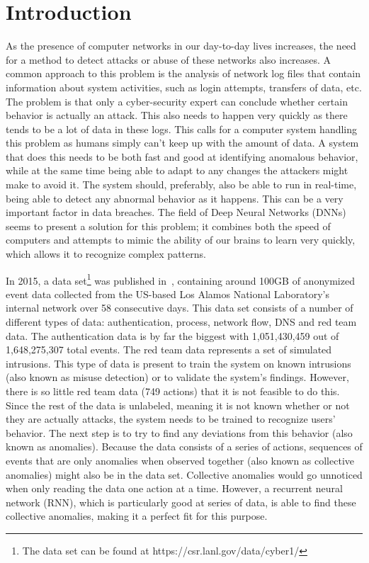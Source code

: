 \chapter{Introduction}\label{ch:introduction}
As the presence of computer networks in our day-to-day lives increases, the need for a method to detect attacks or abuse of these networks also increases. A common approach to this problem is the analysis of network log files that contain information about system activities, such as login attempts, transfers of data, etc. The problem is that only a cyber-security expert can conclude whether certain behavior is actually an attack. This also needs to happen very quickly as there tends to be a lot of data in these logs. This calls for a computer system handling this problem as humans simply can't keep up with the amount of data. A system that does this needs to be both fast and good at identifying anomalous behavior, while at the same time being able to adapt to any changes the attackers might make to avoid it. The system should, preferably, also be able to run in real-time, being able to detect any abnormal behavior as it happens. This can be a very important factor in data breaches. The field of Deep Neural Networks (DNNs) seems to present a solution for this problem; it combines both the speed of computers and attempts to mimic the ability of our brains to learn very quickly, which allows it to recognize complex patterns.

In 2015, a data set\footnote{The data set can be found at https://csr.lanl.gov/data/cyber1/} was published in~\cite{akent-2015-enterprise-data}, containing around 100GB of anonymized event data collected from the US-based Los Alamos National Laboratory's internal network over 58 consecutive days. This data set consists of a number of different types of data: authentication, process, network flow, DNS and red team data. The authentication data is by far the biggest with 1,051,430,459 out of 1,648,275,307 total events. The red team data represents a set of simulated intrusions. This type of data is present to train the system on known intrusions (also known as misuse detection) or to validate the system's findings. However, there is so little red team data (749 actions) that it is not feasible to do this. Since the rest of the data is unlabeled, meaning it is not known whether or not they are actually attacks, the system needs to be trained to recognize users' behavior. The next step is to try to find any deviations from this behavior (also known as anomalies). Because the data consists of a series of actions, sequences of events that are only anomalies when observed together (also known as collective anomalies) might also be in the data set. Collective anomalies would go unnoticed when only reading the data one action at a time. However, a recurrent neural network (RNN), which is particularly good at series of data, is able to find these collective anomalies, making it a perfect fit for this purpose.

